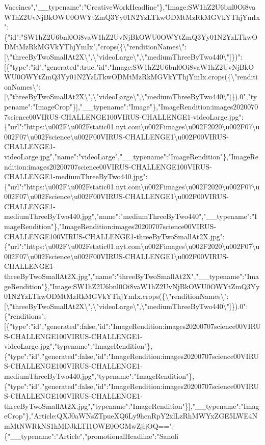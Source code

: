 Vaccines","\_\_typename":"CreativeWorkHeadline"\},"Image:SW1hZ2U6bnl0Oi8vaW1hZ2UvNjBkOWU0OWYtZmQ3Yy01N2YzLTkwODMtMzRkMGVkYThjYmIx":\{"id":"SW1hZ2U6bnl0Oi8vaW1hZ2UvNjBkOWU0OWYtZmQ3Yy01N2YzLTkwODMtMzRkMGVkYThjYmIx","crops(\{\textbackslash{}"renditionNames\textbackslash{}":{[}\textbackslash{}"threeByTwoSmallAt2X\textbackslash{}",\textbackslash{}"videoLarge\textbackslash{}",\textbackslash{}"mediumThreeByTwo440\textbackslash{}"{]}\})":{[}\{"type":"id","generated":true,"id":"Image:SW1hZ2U6bnl0Oi8vaW1hZ2UvNjBkOWU0OWYtZmQ3Yy01N2YzLTkwODMtMzRkMGVkYThjYmIx.crops(\{\textbackslash{}"renditionNames\textbackslash{}":{[}\textbackslash{}"threeByTwoSmallAt2X\textbackslash{}",\textbackslash{}"videoLarge\textbackslash{}",\textbackslash{}"mediumThreeByTwo440\textbackslash{}"{]}\}).0","typename":"ImageCrop"\}{]},"\_\_typename":"Image"\},"ImageRendition:images20200707science00VIRUS-CHALLENGE100VIRUS-CHALLENGE1-videoLarge.jpg":\{"url":"https:\textbackslash{}u002F\textbackslash{}u002Fstatic01.nyt.com\textbackslash{}u002Fimages\textbackslash{}u002F2020\textbackslash{}u002F07\textbackslash{}u002F07\textbackslash{}u002Fscience\textbackslash{}u002F00VIRUS-CHALLENGE1\textbackslash{}u002F00VIRUS-CHALLENGE1-videoLarge.jpg","name":"videoLarge","\_\_typename":"ImageRendition"\},"ImageRendition:images20200707science00VIRUS-CHALLENGE100VIRUS-CHALLENGE1-mediumThreeByTwo440.jpg":\{"url":"https:\textbackslash{}u002F\textbackslash{}u002Fstatic01.nyt.com\textbackslash{}u002Fimages\textbackslash{}u002F2020\textbackslash{}u002F07\textbackslash{}u002F07\textbackslash{}u002Fscience\textbackslash{}u002F00VIRUS-CHALLENGE1\textbackslash{}u002F00VIRUS-CHALLENGE1-mediumThreeByTwo440.jpg","name":"mediumThreeByTwo440","\_\_typename":"ImageRendition"\},"ImageRendition:images20200707science00VIRUS-CHALLENGE100VIRUS-CHALLENGE1-threeByTwoSmallAt2X.jpg":\{"url":"https:\textbackslash{}u002F\textbackslash{}u002Fstatic01.nyt.com\textbackslash{}u002Fimages\textbackslash{}u002F2020\textbackslash{}u002F07\textbackslash{}u002F07\textbackslash{}u002Fscience\textbackslash{}u002F00VIRUS-CHALLENGE1\textbackslash{}u002F00VIRUS-CHALLENGE1-threeByTwoSmallAt2X.jpg","name":"threeByTwoSmallAt2X","\_\_typename":"ImageRendition"\},"Image:SW1hZ2U6bnl0Oi8vaW1hZ2UvNjBkOWU0OWYtZmQ3Yy01N2YzLTkwODMtMzRkMGVkYThjYmIx.crops(\{\textbackslash{}"renditionNames\textbackslash{}":{[}\textbackslash{}"threeByTwoSmallAt2X\textbackslash{}",\textbackslash{}"videoLarge\textbackslash{}",\textbackslash{}"mediumThreeByTwo440\textbackslash{}"{]}\}).0":\{"renditions":{[}\{"type":"id","generated":false,"id":"ImageRendition:images20200707science00VIRUS-CHALLENGE100VIRUS-CHALLENGE1-videoLarge.jpg","typename":"ImageRendition"\},\{"type":"id","generated":false,"id":"ImageRendition:images20200707science00VIRUS-CHALLENGE100VIRUS-CHALLENGE1-mediumThreeByTwo440.jpg","typename":"ImageRendition"\},\{"type":"id","generated":false,"id":"ImageRendition:images20200707science00VIRUS-CHALLENGE100VIRUS-CHALLENGE1-threeByTwoSmallAt2X.jpg","typename":"ImageRendition"\}{]},"\_\_typename":"ImageCrop"\},"Article:QXJ0aWNsZTpueXQ6Ly9hcnRpY2xlLzRhMWYxZGE5LWE4NmMtNWRkNS1hMDJkLTI1OWE0OGMwZjljOQ==":\{"\_\_typename":"Article","promotionalHeadline":"Sanofi
